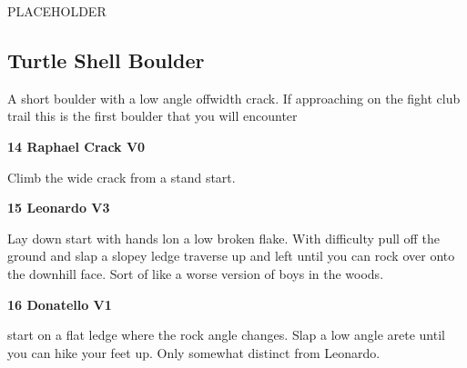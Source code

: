 \begin{multicols}{2}
\begin{minipage}{\linewidth}
					\begin{adjustwidth}{0.5cm}{}				
					PLACEHOLDER
					\end{adjustwidth}
					\end{minipage}
			\subsection*{Turtle Shell Boulder}\label{bf:Turtle Shell Boulder}
			\begin{minipage}{\columnwidth}
			A short boulder with a low angle offwidth crack. If approaching on the fight club trail this is the first boulder that you will encounter
			\end{minipage}
			

					\begin{minipage}{\linewidth}	
					\label{rt:Raphael Crack}
\colorbox{green!20}{
\parbox{0.95\textwidth}{
\textbf{
14 Raphael Crack V0   
}
}
}

					\begin{adjustwidth}{0.5cm}{}				
					Climb the wide crack from a stand start.
					\end{adjustwidth}
					\end{minipage}
					\begin{minipage}{\linewidth}	
					\label{rt:Leonardo}
\colorbox{green!20}{
\parbox{0.95\textwidth}{
\textbf{
15 Leonardo V3   
}
}
}

					\begin{adjustwidth}{0.5cm}{}				
					Lay down start with hands lon a low broken flake. With difficulty pull off the ground and slap a slopey ledge traverse up and left until you can rock over onto the downhill face. Sort of like a worse version of boys in the woods.
					\end{adjustwidth}
					\end{minipage}
					\begin{minipage}{\linewidth}	
					\label{rt:Donatello}
\colorbox{green!20}{
\parbox{0.95\textwidth}{
\textbf{
16 Donatello V1   
}
}
}

					\begin{adjustwidth}{0.5cm}{}				
					start on a flat ledge where the rock angle changes. Slap a low angle arete until you can hike your feet up. Only somewhat distinct from Leonardo.
					\end{adjustwidth}
					\end{minipage}
\newpage

\end{multicols}
